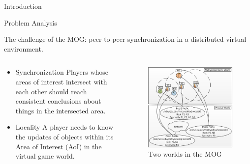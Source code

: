 \documentclass[final,hyperref={pdfpagelabels=false},20pt]{beamer}
\begin{document}
\begin{frame}[t]
\begin{columns}[t]
\begin{column}{.465\textwidth}
\begin{block}{Introduction}
\begin{itemize}
\end{itemize}

\end{block}


\begin{block}{Problem Analysis}

The challenge of the MOG: peer-to-peer synchronization in a distributed virtual environment.
\begin{columns}
\begin{column}{.42\textwidth}
\begin{itemize}
\item Synchronization \newline
Players whose areas of interest intersect with each other should reach consistent conclusions about things in the intersected area.
\item Locality \newline
A player needs to know the updates of objects within its Area of Interest (AoI) in the virtual game world.
\end{itemize}
\end{column}

\begin{column}{.52\textwidth}
\begin{figure}
\includegraphics[width=1\linewidth]{ProblemDemo}
\caption{Two worlds in the MOG}
\label{fig:twoworlds}
\end{figure}


\end{column}
\end{columns}
\end{block}
\end{column}
\end{columns}
\end{frame}
\end{document}
